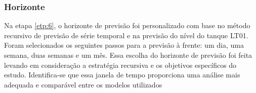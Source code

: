 \subsubsection{Horizonte}

Na etapa \ref{etp:6}, o horizonte de previsão foi personalizado com base no método recursivo de previsão de série temporal e na previsão do nível do tanque LT01. Foram selecionados os seguintes passos para a previsão à frente: um dia, uma semana, duas semanas e um mês. Essa escolha do horizonte de previsão foi feita levando em consideração a estratégia recursiva e os objetivos específicos do estudo. Identifica-se que essa janela de tempo proporciona uma análise mais adequada e comparável entre os modelos utilizados